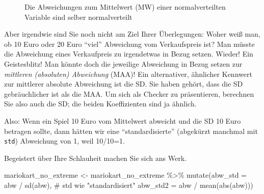\documentclass[
  letterpaper,
]{scrbook}
\newenvironment{Shaded}{\begin{snugshade}}{\end{snugshade}}
\newcommand{\AttributeTok}[1]{\textcolor[rgb]{0.40,0.45,0.13}{#1}}
\newcommand{\CommentTok}[1]{\textcolor[rgb]{0.37,0.37,0.37}{#1}}
\newcommand{\FunctionTok}[1]{\textcolor[rgb]{0.28,0.35,0.67}{#1}}
\newcommand{\NormalTok}[1]{\textcolor[rgb]{0.00,0.23,0.31}{#1}}
\newcommand{\OtherTok}[1]{\textcolor[rgb]{0.00,0.23,0.31}{#1}}
\newcommand{\SpecialCharTok}[1]{\textcolor[rgb]{0.37,0.37,0.37}{#1}}
\theoremstyle{definition}
\theoremstyle{definition}
\theoremstyle{definition}
\theoremstyle{remark}
\begin{document}
\begin{figure}


\caption{\label{fig-norm-dev}Die Abweichungen zum Mittelwert (MW) einer
normalverteilten Variable sind selber normalverteilt}

\end{figure}%

Aber irgendwie sind Sie noch nicht am Ziel Ihrer Überlegungen: Woher
weiß man, ob 10 Euro oder 20 Euro ``viel'' Abweichung vom Verkaufspreis
ist? Man müsste die Abweichung eines Verkaufpreis zu irgendetwas in
Bezug setzen. Wieder! Ein Geistesblitz! Man könnte doch die jeweilige
Abweichung in Bezug setzen zur \emph{mittleren (absoluten) Abweichung}
(MAA)! Ein alternativer, ähnlicher Kennwert zur mittlerer absolute
Abweichung ist die SD. Sie haben gehört, dass die SD gebräuchlicher ist
als die MAA. Um sich als Checker zu präsentieren, berechnen Sie also
auch die SD; die beiden Koeffizienten sind ja ähnlich.

Also: Wenn ein Spiel 10 Euro vom Mittelwert abweicht und die SD 10 Euro
betragen sollte, dann hätten wir eine ``standardisierte'' (abgekürzt
manchmal mit \texttt{std}) Abweichung von 1, weil 10/10=1.

Begeistert über Ihre Schlauheit machen Sie sich ans Werk.

\begin{Shaded}
\begin{Highlighting}[]
\NormalTok{mariokart\_no\_extreme }\OtherTok{\textless{}{-}}
\NormalTok{  mariokart\_no\_extreme }\SpecialCharTok{\%\textgreater{}\%} 
  \FunctionTok{mutate}\NormalTok{(}\AttributeTok{abw\_std =}\NormalTok{ abw }\SpecialCharTok{/} \FunctionTok{sd}\NormalTok{(abw),  }\CommentTok{\# std wie "standardisiert"}
         \AttributeTok{abw\_std2 =}\NormalTok{ abw }\SpecialCharTok{/} \FunctionTok{mean}\NormalTok{(}\FunctionTok{abs}\NormalTok{(abw)))  }
\end{Highlighting}
\end{Shaded}
\end{document}
